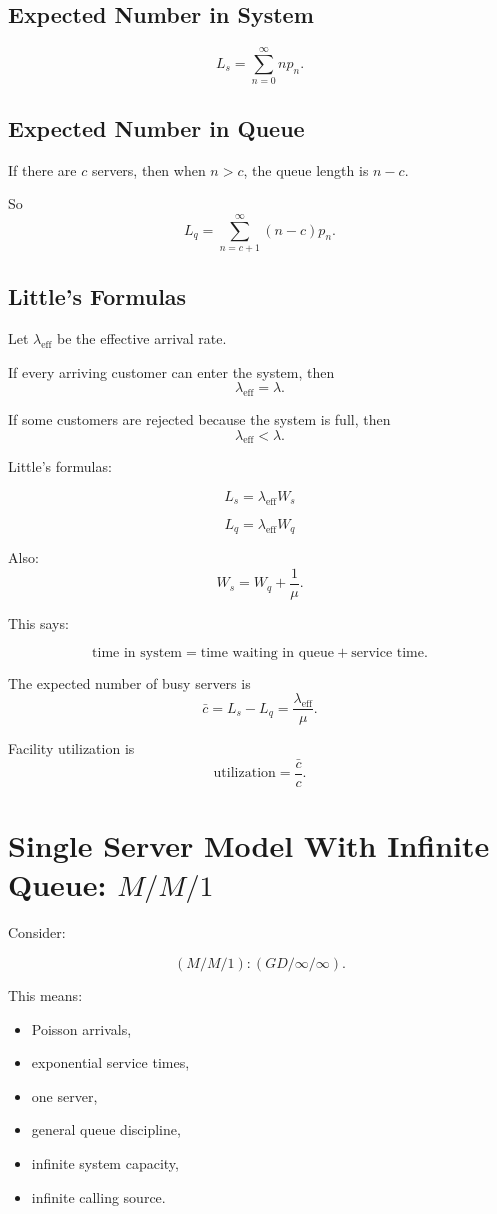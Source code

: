 \documentclass[12pt]{article}
\begin{document}
\subsection*{Expected Number in System}

\[
\boxed{
L_s=\sum_{n=0}^{\infty}np_n.
}
\]

\subsection*{Expected Number in Queue}

If there are \(c\) servers, then when \(n>c\), the queue length is \(n-c\).

So
\[
\boxed{
L_q=\sum_{n=c+1}^{\infty}(n-c)p_n.
}
\]

\subsection*{Little's Formulas}

Let \(\lambda_{\text{eff}}\) be the effective arrival rate.

If every arriving customer can enter the system, then
\[
\lambda_{\text{eff}}=\lambda.
\]

If some customers are rejected because the system is full, then
\[
\lambda_{\text{eff}}<\lambda.
\]

Little's formulas:

\[
\boxed{
L_s=\lambda_{\text{eff}}W_s
}
\]

\[
\boxed{
L_q=\lambda_{\text{eff}}W_q
}
\]

Also:
\[
\boxed{
W_s=W_q+\frac1{\mu}.
}
\]

This says:

\[
\text{time in system}=\text{time waiting in queue}+\text{service time}.
\]

The expected number of busy servers is
\[
\boxed{
\bar{c}=L_s-L_q=\frac{\lambda_{\text{eff}}}{\mu}.
}
\]

Facility utilization is
\[
\boxed{
\text{utilization}=\frac{\bar{c}}{c}.
}
\]

\section{Single Server Model With Infinite Queue: \(M/M/1\)}

Consider:

\[
(M/M/1):(GD/\infty/\infty).
\]

This means:

\begin{itemize}
    \item Poisson arrivals,
    \item exponential service times,
    \item one server,
    \item general queue discipline,
    \item infinite system capacity,
    \item infinite calling source.
\end{itemize}
\end{document}
